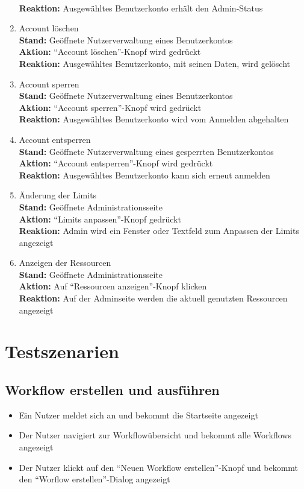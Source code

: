 \begin{enumerate}
        \\ \textbf{Reaktion:} Ausgewähltes Benutzerkonto erhält den \Gls{Admin}-Status
    \item Account löschen
        \\ \textbf{Stand:} Geöffnete Nutzerverwaltung eines Benutzerkontos
        \\ \textbf{Aktion:} \enquote{Account löschen}-Knopf wird gedrückt
        \\ \textbf{Reaktion:} Ausgewähltes Benutzerkonto, mit seinen Daten, wird gelöscht
    \item Account sperren
        \\ \textbf{Stand:} Geöffnete Nutzerverwaltung eines Benutzerkontos
        \\ \textbf{Aktion:} \enquote{Account sperren}-Knopf wird gedrückt
        \\ \textbf{Reaktion:} Ausgewähltes Benutzerkonto wird vom Anmelden abgehalten
    \item Account entsperren
        \\ \textbf{Stand:} Geöffnete Nutzerverwaltung eines gesperrten Benutzerkontos
        \\ \textbf{Aktion:} \enquote{Account entsperren}-Knopf wird gedrückt
        \\ \textbf{Reaktion:} Ausgewähltes Benutzerkonto kann sich erneut anmelden
    \item Änderung der Limits
        \\ \textbf{Stand:} Geöffnete Administrationsseite
        \\ \textbf{Aktion:} \enquote{Limits anpassen}-Knopf gedrückt
        \\ \textbf{Reaktion:} \gls{Admin} wird ein Fenster oder Textfeld zum Anpassen der Limits angezeigt
    \item Anzeigen der Ressourcen
        \\ \textbf{Stand:} Geöffnete Administrationsseite
        \\ \textbf{Aktion:} Auf \enquote{Ressourcen anzeigen}-Knopf klicken
        \\ \textbf{Reaktion:} Auf der Adminseite werden die aktuell genutzten Ressourcen angezeigt
\end{enumerate}


\section{Testszenarien}

\subsection*{Workflow erstellen und ausführen}
\begin{itemize}
    \item Ein \Gls{Nutzer} meldet sich an und bekommt die Startseite angezeigt
    \item Der \Gls{Nutzer} navigiert zur Workflowübersicht und bekommt alle Workflows angezeigt
    \item Der \gls{Nutzer} klickt auf den \enquote{Neuen Workflow erstellen}-Knopf und bekommt den \enquote{Worflow erstellen}-Dialog angezeigt
\end{itemize}

